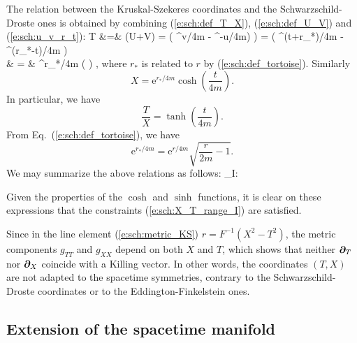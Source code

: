 The relation between the Kruskal-Szekeres coordinates and the
Schwarzschild-Droste ones is obtained by combining (\ref{e:sch:def_T_X}),
(\ref{e:sch:def_U_V}) and (\ref{e:sch:u_v_r_t}):
\bea
    T &=& (U+V) =  \left( ^{v/4m}
        - ^{-u/4m)} \right) =
         \left( ^{(t+r_*)/4m}
        - ^{(r_*-t)/4m} \right) \nonumber \\
     & = & ^{r_*/4m} \sinh\left(  \right) ,\nonumber
\eea
where $r_*$ is related to $r$ by (\ref{e:sch:def_tortoise}).
Similarly
\[
     X = \mathrm{e}^{r_*/4m} \cosh\left( \frac{t}{4m} \right) .
\]
In particular, we have
\[
    \frac{T}{X} = \tanh\left( \frac{t}{4m} \right) .
\]
From Eq.~(\ref{e:sch:def_tortoise}), we have
\[
    \mathrm{e}^{r_*/4m} = \mathrm{e}^{r/4m} \sqrt{ \frac{r}{2m} - 1 } .
\]
We may summarize the above relations as follows:
\be
    \M_{\rm I}: \quad {}
    \iff
\ee
\begin{remark}
Given the properties of the $\cosh$ and $\sinh$ functions, it is clear on these
expressions that the constraints (\ref{e:sch:X_T_range_I}) are satisfied.
\end{remark}
\begin{remark}
Since in the line element (\ref{e:sch:metric_KS}) $r=F^{-1}(X^2-T^2)$,
the metric components $g_{TT}$ and $g_{XX}$ depend on both $X$ and $T$, which
shows that neither $\bm{\partial}_T$ nor $\bm{\partial}_X$ coincide with a Killing vector.
In other words, the coordinates $(T,X)$ are not adapted to the spacetime
symmetries, contrary to the Schwarzschild-Droste coordinates or to the
Eddington-Finkelstein ones.
\end{remark}

\subsection{Extension of the spacetime manifold}


